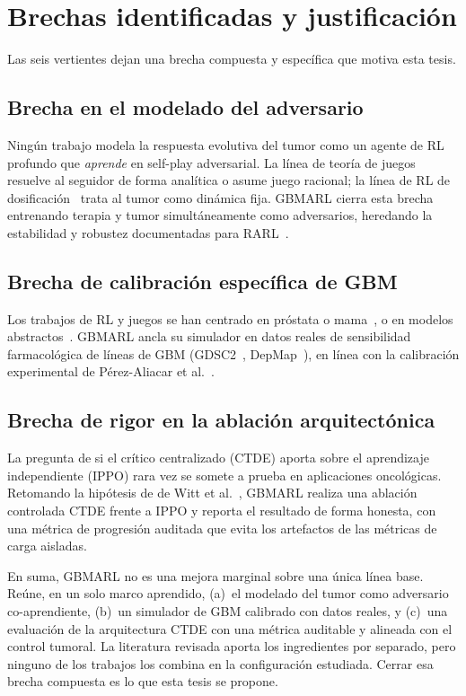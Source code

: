 \section{Brechas identificadas y justificación}
\label{sec:brechas}

Las seis vertientes dejan una brecha compuesta y específica que motiva esta tesis.

\subsection{Brecha en el modelado del adversario}
Ningún trabajo modela la respuesta evolutiva del tumor como un agente de RL profundo que \emph{aprende} en self-play adversarial. La línea de teoría de juegos~\cite{Stankova2019,Salvioli2024,Romano2024} resuelve al seguidor de forma analítica o asume juego racional; la línea de RL de dosificación~\cite{Gallagher2024,Mashayekhi2023} trata al tumor como dinámica fija. GBMARL cierra esta brecha entrenando terapia y tumor simultáneamente como adversarios, heredando la estabilidad y robustez documentadas para RARL~\cite{Pinto2017}.

\subsection{Brecha de calibración específica de GBM}
Los trabajos de RL y juegos se han centrado en próstata o mama~\cite{Zhang2017,Tavakoli2025}, o en modelos abstractos~\cite{Karima2025}. GBMARL ancla su simulador en datos reales de sensibilidad farmacológica de líneas de GBM (GDSC2~\cite{GDSC}, DepMap~\cite{DepMap}), en línea con la calibración experimental de Pérez-Aliacar et al.~\cite{PerezAliacar2024}.

\subsection{Brecha de rigor en la ablación arquitectónica}
La pregunta de si el crítico centralizado (CTDE) aporta sobre el aprendizaje independiente (IPPO) rara vez se somete a prueba en aplicaciones oncológicas. Retomando la hipótesis de de Witt et al.~\cite{deWitt2020}, GBMARL realiza una ablación controlada CTDE frente a IPPO y reporta el resultado de forma honesta, con una métrica de progresión auditada que evita los artefactos de las métricas de carga aisladas.

En suma, GBMARL no es una mejora marginal sobre una única línea base. Reúne, en un solo marco aprendido, (a)~el modelado del tumor como adversario co-aprendiente, (b)~un simulador de GBM calibrado con datos reales, y (c)~una evaluación de la arquitectura CTDE con una métrica auditable y alineada con el control tumoral. La literatura revisada aporta los ingredientes por separado, pero ninguno de los trabajos los combina en la configuración estudiada. Cerrar esa brecha compuesta es lo que esta tesis se propone.

